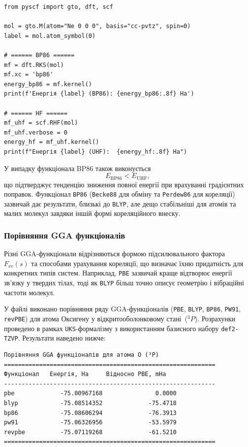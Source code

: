 \begin{verbatim}
from pyscf import gto, dft, scf

mol = gto.M(atom="Ne 0 0 0", basis="cc-pvtz", spin=0)
label = mol.atom_symbol(0)

# ====== BP86 ======
mf = dft.RKS(mol)
mf.xc = 'bp86'
energy_bp86 = mf.kernel()
print(f'Енергія {label} (BP86): {energy_bp86:.8f} Ha')

# ====== HF ======
mf_uhf = scf.RHF(mol)
mf_uhf.verbose = 0
energy_hf = mf_uhf.kernel()
print(f"Енергія {label} (UHF):  {energy_hf:.8f} Ha")
\end{verbatim}

У випадку функціонала BP86 також виконується
\[
E_{\text{BP86}} < E_{\text{UHF}},
\]
що підтверджує тенденцію зниження повної енергії при врахуванні
градієнтних поправок.
Функціонал \texttt{BP86} (\texttt{Becke88} для обміну та \texttt{Perdew86} для кореляції)
зазвичай дає результати, близькі до \texttt{BLYP}, але дещо стабільніші для атомів
та малих молекул завдяки іншій формі кореляційного внеску.

\subsubsection{Порівняння GGA функціоналів}

Різні GGA-функціонали відрізняються формою підсилювального фактора $F_{xc}(s)$ та способами урахування кореляції, що визначає їхню придатність для конкретних типів систем.
Наприклад, \texttt{PBE} зазвичай краще відтворює енергії зв’язку у твердих тілах, тоді як \texttt{BLYP} більш точно описує геометрію і вібраційні частоти молекул.

У файлі  виконано порівняння ряду GGA-функціоналів (\texttt{PBE}, \texttt{BLYP}, \texttt{BP86}, \texttt{PW91}, \texttt{revPBE}) для атома Оксигену у відкритооболонковому стані~($^3P$).
Розрахунки проведено в рамках \texttt{UKS}-формалізму з використанням базисного набору \texttt{def2-TZVP}.
Результати наведено нижче:

\begin{verbatim}
Порівняння GGA функціоналів для атома O (³P)
============================================================
Функціонал   Енергія, Ha     Відносно PBE, mHa
------------------------------------------------------------
pbe             -75.00967168               0.0000
blyp            -75.08514352             -75.4718
bp86            -75.08606294             -76.3913
pw91            -75.06326956             -53.5979
revpbe          -75.07119268             -61.5210
============================================================
\end{verbatim}

